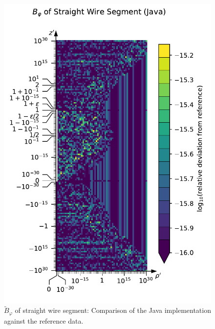 \begin{figure}[htbp]
 \centering
 \includegraphics[height=\textwidth]{img/StraightWireSegment_B_phi_Java.pdf}
 \caption{$\tilde{B}_\varphi$ of straight wire segment: Comparison of the Java implementation against the reference data.}
 \label{fig:StraightWireSegment_B_phi_Java}
\end{figure}

